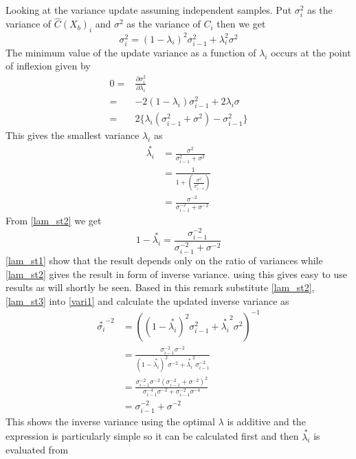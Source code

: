 \documentclass[a4paper,oneside,english]{article}
\numberwithin{equation}{section}
\numberwithin{figure}{section}
\begin{document}
Looking at the variance update assuming independent samples. Put $\sigma_i^2$ as the variance of $\hat{C}(X_b)_{i}$ and $\sigma^2$ as the variance of $C_i$ then we get
\begin{equation}\label{vari1}
\sigma_i^2=(1-\lambda_i)^2\sigma_{i-1}^2 +\lambda_i^2 \sigma^2
\end{equation} 
The minimum value of the update variance as a function of $\lambda_i$ occurs at the point of inflexion given by
\begin{align}
0=&\frac{\partial \sigma_i^2}{\partial \lambda_i}\\
=&-2(1-\lambda_i)\sigma_{i-1}^2+2\lambda_i \sigma\\
=&2\{ \lambda_i(\sigma_{i-1}^2 + \sigma^2) -\sigma_{i-1}^2\}
\end{align} 
This gives the smallest variance $\lambda_i$ as
\begin{align}
\stackrel{*}{\lambda_i} &= \frac{\sigma^2}{\sigma_{i-1}^2 + \sigma^2}\\
&=\frac{1}{1+(\frac{\sigma^2}{\sigma_{i-1}^2})} \label{lam_st1}\\
&=\frac{\sigma^{-2}}{\sigma_{i-1}^{-2} + \sigma^{-2}}
\label{lam_st2}
\end{align}
From \eqref{lam_st2} we get
\begin{equation}\label{lam_st3}
1-\stackrel{*}{\lambda_i} =\frac{\sigma_{i-1}^{-2}}{\sigma_{i-1}^{-2} + \sigma^{-2}} 
\end{equation}
\eqref{lam_st1} show that the result depends only on the ratio of variances while \eqref{lam_st2} gives the result in form of inverse variance. using this gives easy to use results as will shortly be seen. Based in this remark substitute \eqref{lam_st2},\eqref{lam_st3} into \eqref{vari1} and calculate the updated inverse variance as
\begin{align}
\stackrel{*}{\sigma_i}^{-2}&=((1-\stackrel{*}{\lambda_i})^2\sigma_{i-1}^2 +\stackrel{*}{\lambda_i}^2 \sigma^{2})^{-1}\\
&=\frac{\sigma_{i-1}^{-2} \sigma^{-2}}{(1-\stackrel{*}{\lambda_i})^2\sigma^{-2} +\stackrel{*}{\lambda_i}^2 \sigma_{i-1}^{-2}}\\
&=\frac{\sigma_{i-1}^{-2}\sigma^{-2}(\sigma_{i-1}^{-2} + \sigma^{-2})^2 }{\sigma_{i-1}^{-4}\sigma^{-2} + \sigma_{i-1}^{-2}\sigma^{-4}}\\
&=\sigma_{i-1}^{-2}+\sigma^{-2} \label{inv_var1}
\end{align}  
This shows the inverse variance using the optimal $\lambda$ is additive and the expression is particularly simple so it can be calculated first and then $\stackrel{*}{\lambda_i}$ is evaluated from
\end{document}
